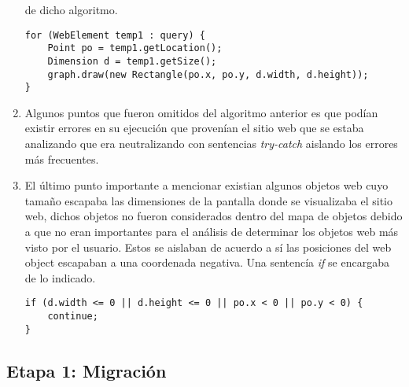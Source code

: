\begin{enumerate}
		de dicho algoritmo.
					\begin{lstlisting}[style=Java, caption={Algoritmo mapa de objetos simplificado.}]
for (WebElement temp1 : query) {
	Point po = temp1.getLocation();
    Dimension d = temp1.getSize();
    graph.draw(new Rectangle(po.x, po.y, d.width, d.height));
}
\end{lstlisting}
		\item Algunos puntos que fueron omitidos del algoritmo anterior es que podían existir 
		errores en su ejecución que provenían el sitio web que se estaba analizando que era 
		neutralizando con sentencias \textit{try-catch} aislando los errores más frecuentes.
		\item El último punto importante a mencionar existian algunos objetos web cuyo tamaño 
		escapaba las dimensiones de la pantalla donde se visualizaba el sitio web, dichos objetos
		no fueron considerados dentro del mapa de objetos debido a que no eran importantes 
		para el análisis de determinar los objetos web más visto por el usuario. Estos 
		se aislaban de acuerdo a sí las posiciones del web object escapaban a una coordenada
		negativa. Una sentencía \textit{if} se encargaba de lo indicado. 
		\begin{lstlisting}[style=Java, caption={Obtención \textit{WebObjects}.}]
if (d.width <= 0 || d.height <= 0 || po.x < 0 || po.y < 0) {
	continue;
}
\end{lstlisting}
        \end{enumerate}
        
	\subsection{Etapa 1: Migración}
	
